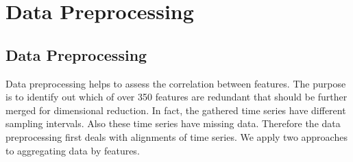 \chapter{Data Preprocessing}

\section{Data Preprocessing}\label{sec:dataprocessing}

Data preprocessing helps to assess the correlation between features. The purpose is to identify out which of over 350 features are redundant that should be further merged for dimensional reduction. In fact, the gathered time series have different sampling intervals. Also these time series have missing data. Therefore the data preprocessing first deals with alignments of time series. We apply two approaches to aggregating data by features. 

